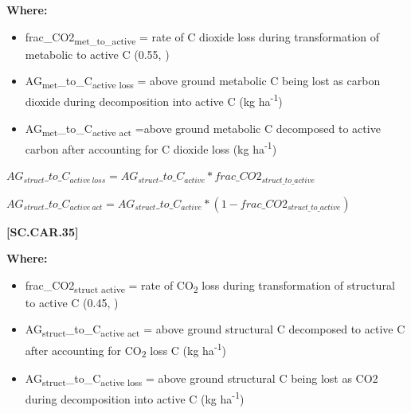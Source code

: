         \textbf{Where:}
            
        \begin{itemize}
            \item frac\_CO2\textsubscript{met\_to\_active} = rate of C dioxide loss during transformation of metabolic to active C (0.55, \cite{parton1987analysis})
            \item AG\textsubscript{met}\_to\_C\textsubscript{active loss} = above ground metabolic C being lost as carbon dioxide during decomposition into active C (kg ha\textsuperscript{-1})
            \item AG\textsubscript{met}\_to\_C\textsubscript{active act} 	=above ground metabolic C decomposed to active carbon after accounting for C dioxide loss (kg ha\textsuperscript{-1})
        \end{itemize}
        \vspace{0.5cm}

    \begin{center}
\(AG_{struct}\_to\_C_{active\ loss}=AG_{struct}\_to\_C_{active} * frac\_CO2_{struct\_to\_active} \)
\vspace{0.1cm}

\(AG_{struct}\_to\_C_{active\ act}=AG_{struct}\_to\_C_{active} * (1-frac\_CO2_{struct\_to\_active})\)

    \end{center}
        \vspace{0.5cm} 
    
            {\raggedleft \textbf{[SC.CAR.35]}\par}
            \vspace{0.5cm}

        \textbf{Where:}
            
        \begin{itemize}
            \item frac\_CO2\textsubscript{struct active} = rate of CO\textsubscript{2} loss during transformation of structural to	active C (0.45, \parencite{parton1987analysis})

            \item AG\textsubscript{struct}\_to\_C\textsubscript{active act} = above ground structural C decomposed to active C after accounting for CO\textsubscript{2} loss C (kg ha\textsuperscript{-1})
            \item AG\textsubscript{struct}\_to\_C\textsubscript{active loss} = above ground structural C being lost as CO2 during decomposition into active C (kg ha\textsuperscript{-1})
        \end{itemize}
        \vspace{0.5cm}

